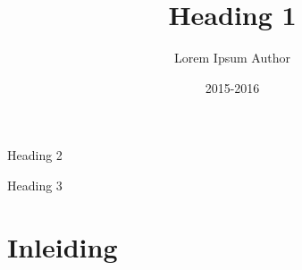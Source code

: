 \documentclass[11pt, a4paper, oneside]{article}
\title{Heading 1}
\date{2015-2016}
\author{Lorem Ipsum Author}
\newcommand{\subtitle}{Heading 2}
\newcommand{\subsubtitle}{Heading 3}
\begin{document}

	\begin{titlepage}

				 \AddToShipoutPicture*{\BackgroundPic}

				\vspace*{130mm}

				\begin{flushright}
				\bf
				\color{oranjerood}
				{
					\scshape	
					\huge
					\selectfont
					\thetitle
				}

				\vspace{0mm}
				\LARGE
				\subtitle
				\end{flushright}
				\vspace{\fill}
				{\color{blauwgroen} \subsubtitle}

				\newpage

	\end{titlepage}


\tableofcontents

\newpage



\chapter{Inleiding}
\end{document}
